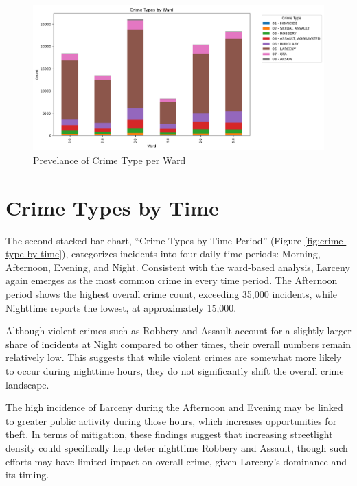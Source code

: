 \documentclass{report}
\begin{document}
\begin{figure}[ht]
  \begin{center}
    \advance\leftskip-3cm
    \advance\rightskip-3cm
    \includegraphics[keepaspectratio=true,scale=.6]{crime-types-by-ward}
    \caption{Prevelance of Crime Type per Ward}
    \label{fig:crime-type-by-ward}
  \end{center}
\end{figure}

\newpage
\section{Crime Types by Time}
\par The second stacked bar chart, “Crime Types by Time Period” (Figure \ref{fig:crime-type-by-time}), categorizes incidents into four daily time periods: Morning, Afternoon, Evening, and Night. Consistent with the ward-based analysis, Larceny again emerges as the most common crime in every time period. The Afternoon period shows the highest overall crime count, exceeding 35,000 incidents, while Nighttime reports the lowest, at approximately 15,000.

Although violent crimes such as Robbery and Assault account for a slightly larger share of incidents at Night compared to other times, their overall numbers remain relatively low. This suggests that while violent crimes are somewhat more likely to occur during nighttime hours, they do not significantly shift the overall crime landscape.

The high incidence of Larceny during the Afternoon and Evening may be linked to greater public activity during those hours, which increases opportunities for theft. In terms of mitigation, these findings suggest that increasing streetlight density could specifically help deter nighttime Robbery and Assault, though such efforts may have limited impact on overall crime, given Larceny's dominance and its timing.
\end{document}
